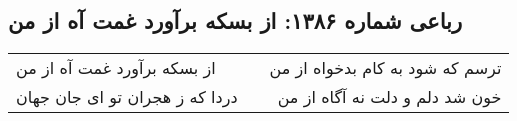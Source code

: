 \begin{center}
\section*{رباعی شماره ۱۳۸۶: از بسکه برآورد غمت آه از من}
\label{sec:1386}
\begin{longtable}{l p{0.5cm} r}
از بسکه برآورد غمت آه از من
&&
ترسم که شود به کام بدخواه از من
\\
دردا که ز هجران تو ای جان جهان
&&
خون شد دلم و دلت نه آگاه از من
\\
\end{longtable}
\end{center}

